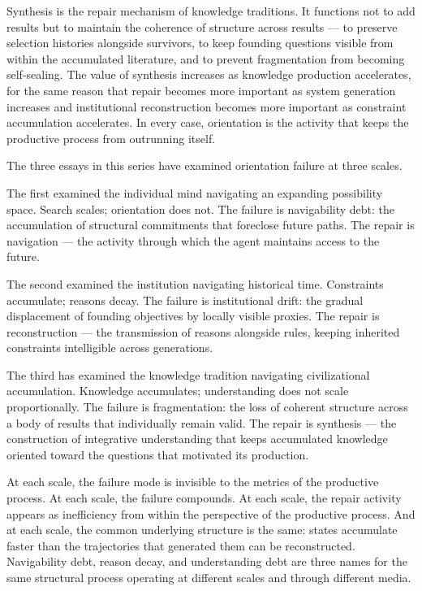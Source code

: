 Synthesis is the repair mechanism of knowledge traditions. It functions not
to add results but to maintain the coherence of structure across results ---
to preserve selection histories alongside survivors, to keep founding questions
visible from within the accumulated literature, and to prevent fragmentation
from becoming self-sealing. The value of synthesis increases as knowledge
production accelerates, for the same reason that repair becomes more important
as system generation increases and institutional reconstruction becomes more
important as constraint accumulation accelerates. In every case, orientation
is the activity that keeps the productive process from outrunning itself.

\bigskip

The three essays in this series have examined orientation failure at three
scales.

The first examined the individual mind navigating an expanding possibility
space. Search scales; orientation does not. The failure is navigability debt:
the accumulation of structural commitments that foreclose future paths. The
repair is navigation --- the activity through which the agent maintains access
to the future.

The second examined the institution navigating historical time. Constraints
accumulate; reasons decay. The failure is institutional drift: the gradual
displacement of founding objectives by locally visible proxies. The repair
is reconstruction --- the transmission of reasons alongside rules, keeping
inherited constraints intelligible across generations.

The third has examined the knowledge tradition navigating civilizational
accumulation. Knowledge accumulates; understanding does not scale proportionally.
The failure is fragmentation: the loss of coherent structure across a body
of results that individually remain valid. The repair is synthesis --- the
construction of integrative understanding that keeps accumulated knowledge
oriented toward the questions that motivated its production.

At each scale, the failure mode is invisible to the metrics of the productive
process. At each scale, the failure compounds. At each scale, the repair
activity appears as inefficiency from within the perspective of the productive
process. And at each scale, the common underlying structure is the same:
states accumulate faster than the trajectories that generated them can be
reconstructed. Navigability debt, reason decay, and understanding debt are
three names for the same structural process operating at different scales
and through different media.

